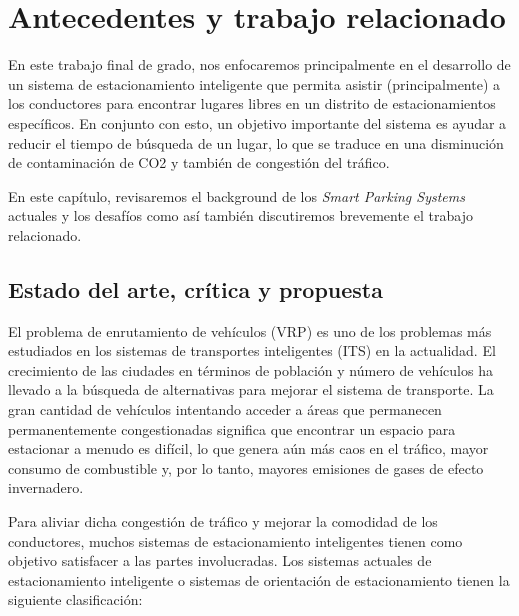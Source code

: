\newpage
\section{Antecedentes y trabajo relacionado}
En este trabajo final de grado, nos enfocaremos principalmente en el desarrollo de un sistema de estacionamiento inteligente que permita asistir (principalmente) a los conductores para encontrar lugares libres en un distrito de estacionamientos específicos. En conjunto con esto, un objetivo importante del sistema es ayudar a reducir el tiempo de búsqueda de un lugar, lo que se traduce en una disminución de contaminación de CO2 y también de congestión del tráfico.

En este capítulo, revisaremos el background de los \textit{Smart Parking Systems} actuales y los desafíos como así también discutiremos brevemente el trabajo relacionado.

\subsection{Estado del arte, crítica y propuesta}
El problema de enrutamiento de vehículos (VRP) es uno de los problemas más estudiados en los sistemas de transportes inteligentes (ITS) en la actualidad. El crecimiento de las ciudades en términos de población y número de vehículos ha llevado a la búsqueda de alternativas para mejorar el sistema de transporte. La gran cantidad de vehículos intentando acceder a áreas que permanecen permanentemente congestionadas significa que encontrar un espacio para estacionar a menudo es difícil, lo que genera aún más caos en el tráfico, mayor consumo de combustible y, por lo tanto, mayores emisiones de gases de efecto invernadero.

Para aliviar dicha congestión de tráfico y mejorar la comodidad de los conductores, muchos sistemas de estacionamiento inteligentes tienen como objetivo satisfacer a las partes involucradas. Los sistemas actuales de estacionamiento inteligente o sistemas de orientación de estacionamiento tienen la siguiente clasificación: 

